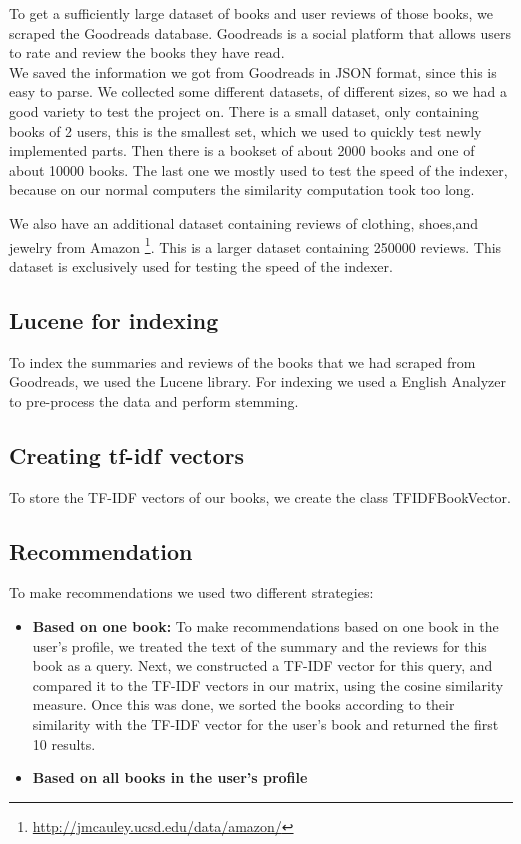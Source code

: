 \documentclass[10pt,a4paper]{paper}
\begin{document}
To get a sufficiently large dataset of books and user reviews of those books, we scraped the Goodreads database. Goodreads is a social platform that allows users to rate and review the books they have read. \\
We saved the information we got from Goodreads in JSON format, since this is easy to parse.
We collected some different datasets, of different sizes, so we had a good variety to test the project on. There is a small dataset, only containing books of 2 users, this is the smallest set, which we used to quickly test newly implemented parts. Then there is a bookset of about 2000 books and one of about 10000 books. The last one we mostly used to test the speed of the indexer, because on our normal computers the similarity computation took too long.

We also have an additional dataset containing reviews of clothing, shoes,and jewelry from Amazon \footnote{\url{http://jmcauley.ucsd.edu/data/amazon/}}. This is a larger dataset containing 250000 reviews. This dataset is exclusively used for testing the speed of the indexer.

\subsection{Lucene for indexing}

To index the summaries and reviews of the books that we had scraped from Goodreads, we used the Lucene library. For indexing we used a English Analyzer to pre-process the data and perform stemming.

\subsection{Creating tf-idf vectors}

To store the TF-IDF vectors of our books, we create the class TFIDFBookVector.


\subsection{Recommendation}

To make recommendations we used two different strategies:
\begin{itemize}
\item \textbf{Based on one book:} To make recommendations based on one book in the user's profile, we treated the text of the summary and the reviews for this book as a query. Next, we constructed a TF-IDF vector for this query, and compared it to the TF-IDF vectors in our matrix, using the cosine similarity measure. Once this was done, we sorted the books according to their similarity with the TF-IDF vector for the user's book and returned the first 10 results.
\item \textbf{Based on all books in the user's profile} %
\end{itemize}
\end{document}
